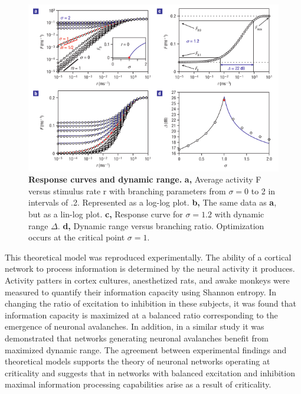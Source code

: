 \documentclass[12pt]{article}
\begin{document}
\begin{figure}      
  \begin{center}    
 \includegraphics[width=.8\textwidth]{dynamicrangetheorycopelli}    
    \caption{\textbf{Response curves and dynamic range.} \textbf{a,} Average activity F versus stimulus rate r with branching parameters from $\sigma{} = 0$ to 2 in intervals of .2. Represented as a log-log plot. \textbf{b,} The same data as \textbf{a}, but as a lin-log plot. \textbf{c,} Response curve for $\sigma = 1.2$ with dynamic range $\Delta$. \textbf{d,} Dynamic range versus branching ratio. Optimization occurs at the critical point $\sigma = 1$.\cite{Kinouchi2006b}}   
   \label{Figure::Dynamic Range Theory}   
  \end{center}     
   \end{figure}


This theoretical model was reproduced experimentally\cite{Shew2009b}. The ability of a cortical network to process information is determined by the neural activity it produces. Activity patters in cortex cultures, anesthetized rats, and awake monkeys were measured to quantify their information capacity using Shannon entropy. In changing the ratio of excitation to inhibition in these subjects, it was found that information capacity is maximized at a balanced ratio corresponding to the emergence of neuronal avalanches. In addition, in a similar study it was demonstrated that networks generating neuronal avalanches benefit from maximized dynamic range\cite{Shew2011a}. The agreement between experimental findings and theoretical models supports the theory of neuronal networks operating at criticality and suggests that in networks with balanced excitation and inhibition maximal information processing capabilities arise as a result of criticality. 
\end{document}
